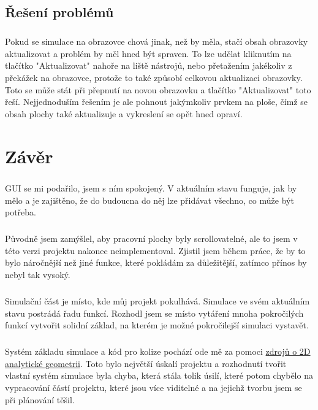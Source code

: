 \documentclass[12pt,a4paper]{report}
\begin{document}
\section{Řešení problémů}
\paragraph{} Pokud se simulace na obrazovce chová jinak, než by měla, stačí obsah obrazovky aktualizovat a problém by měl hned být spraven. To lze udělat kliknutím na tlačítko "Aktualizovat"{} nahoře na liště nástrojů, nebo přetažením jakékoliv z překážek na obrazovce, protože to také způsobí celkovou aktualizaci obrazovky. Toto se může stát při přepnutí na novou obrazovku a tlačítko "Aktualizovat"{} toto řeší. Nejjednoduším řešením je ale pohnout jakýmkoliv prvkem na ploše, čímž se obsah plochy také aktualizuje a vykreslení se opět hned opraví.

\chapter{Závěr}
\paragraph{} GUI se mi podařilo, jsem s ním spokojený. V aktuálním stavu funguje, jak by mělo a je zajištěno, že do budoucna do něj lze přidávat všechno, co může být potřeba.
\paragraph{} Původně jsem zamýšlel, aby pracovní plochy byly scrollovatelné, ale to jsem v této verzi projektu nakonec neimplementoval. Zjistil jsem během práce, že by to bylo náročnější než jiné funkce, které pokládám za důležitější, zatímco přínos by nebyl tak vysoký.
\paragraph{} Simulační část je místo, kde můj projekt pokulhává. Simulace ve svém aktuálním stavu postrádá řadu funkcí. Rozhodl jsem se místo vytáření mnoha pokročilých funkcí vytvořit solidní základ, na kterém je možné pokročilejší simulaci vystavět.
\paragraph{} Systém základu simulace a kód pro kolize pochází ode mě za pomoci \href{https://paulbourke.net/geometry/pointlineplane/}{zdrojů o 2D analytické geometrii}. Toto bylo největší úskalí projektu a rozhodnutí tvořit vlastní systém simulace byla chyba, která stála tolik úsilí, které potom chybělo na vypracování částí projektu, které jsou více viditelné a na jejichž tvorbu jsem se při plánování těšil.
\end{document}
